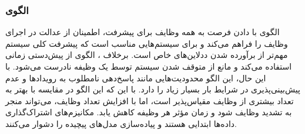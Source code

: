 \subsubsection{الگوی }
\label{archConRoundRobSec}
\begin{RTL}
الگوی  \cite{ref4} با
دادن فرصت به همه وظایف برای پیشرفت،
اطمینان از عدالت در اجرای وظایف را فراهم می‌کند و برای سیستم‌هایی مناسب
است که پیشرفت کلی سیستم مهم‌تر از برآورده شدن ددلاین‌های خاص است.
برخلاف ، الگوی
 از پیش‌دستی زمانی
استفاده می‌کند و مانع از متوقف شدن سیستم توسط یک وظیفه
نادرست می‌شود. با این حال، این الگو محدودیت‌هایی مانند پاسخ‌دهی
نامطلوب به رویدادها و عدم پیش‌بینی‌پذیری در شرایط بار بسیار زیاد
را دارد. با این که این الگو در مقایسه با 
بهتر به تعداد بیشتری از
وظایف مقیاس‌پذیر است، اما با افزایش تعداد وظایف، می‌تواند منجر به تشدید وظایف شود
و زمان مؤثر هر وظیفه کاهش یابد. مکانیزم‌های اشتراک‌گذاری داده‌ها ابتدایی هستند
و پیاده‌سازی مدل‌های پیچیده را دشوار می‌کنند.
\end{RTL}